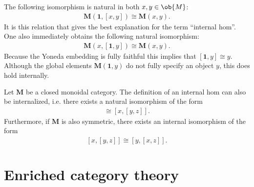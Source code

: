     \begin{property}\label{cat:internal_hom_property}
        The following isomorphism is natural in both $x,y\in\ob{M}$:
        \begin{gather}
            \mathbf{M}(\mathbf{1},[x,y])\cong\mathbf{M}(x,y).
        \end{gather}
        It is this relation that gives the best explanation for the term ``internal hom''. One also immediately obtains the following natural isomorphism:
        \begin{gather}
            \mathbf{M}(x,[\mathbf{1},y])\cong\mathbf{M}(x,y).
        \end{gather}
        Because the Yoneda embedding is fully faithful this implies that $[\mathbf{1},y]\cong y$. Although the global elements $\mathbf{M}(\mathbf{1},y)$ do not fully specify an object $y$, this does hold internally.
    \end{property}

    \begin{property}[Symmetry]
        Let $\mathbf{M}$ be a closed monoidal category. The definition of an internal hom can also be internalized, i.e. there exists a natural isomorphism of the form
        \begin{gather}
            [x\otimes y,z]\cong[x,[y,z]].
        \end{gather}
        Furthermore, if $\mathbf{M}$ is also symmetric, there exists an internal isomorphism of the form
        \begin{gather}
            \label{cat:internal_symmetry}
            [x,[y,z]]\cong[y,[x,z]].
        \end{gather}
    \end{property}


\section{Enriched category theory}\label{section:enriched_category_theory}

